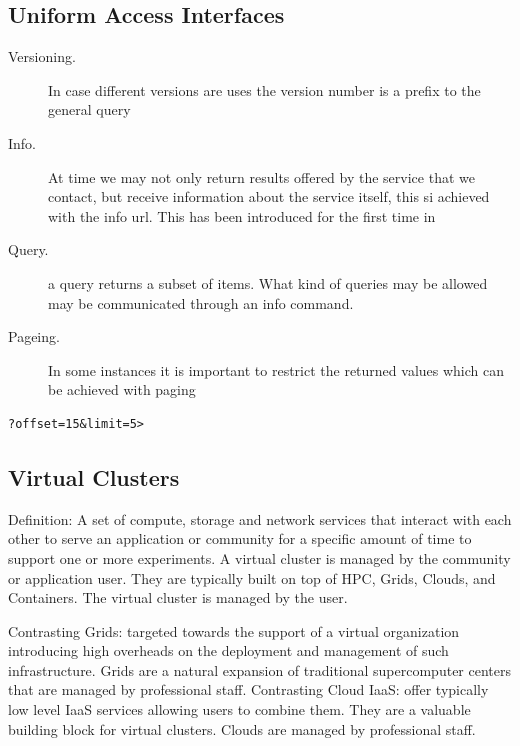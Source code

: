 \subsection{Uniform Access Interfaces}

\begin{description}

\item[Versioning.] In case different versions are uses the version number is a prefix to
the general query

\item [Info.] At time we may not only return results offered by the service that we
contact, but receive information about the service itself, this si
achieved with the info url. This has been introduced for the first
time in \cite{las02infogram}

\item [Query.] a query returns a subset of items. What kind of queries
  may be allowed may be communicated through an info command.

\item [Pageing.] In some instances it is important to restrict the returned values
which can be achieved with paging

\end{description}

\begin{Verbatim}
?offset=15&limit=5>
\end{Verbatim}

\subsection{Virtual Clusters}

Definition: A set of compute, storage and network services that
interact with each other to serve an application or community for a
specific amount of time to support one or more experiments. A virtual
cluster is managed by the community or application user. They are
typically built on top of HPC, Grids, Clouds, and Containers. The
virtual cluster is managed by the user.

Contrasting Grids: targeted towards the support of a virtual
organization introducing high overheads on the deployment and
management of such infrastructure. Grids are a natural expansion of
traditional supercomputer centers that are managed by professional
staff. Contrasting Cloud IaaS: offer typically low level IaaS services
allowing users to combine them. They are a valuable building block for
virtual clusters. Clouds are managed by professional staff.

